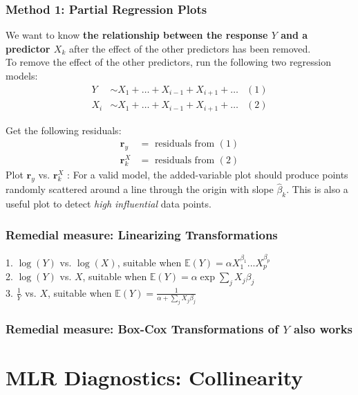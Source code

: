 \documentclass[11pt,a4paper]{article}
\begin{document}
\subsubsection{Method 1: Partial Regression Plots}
We want to know \textbf{the relationship between the response $Y$ and a predictor $X_{k}$} after the effect of the other predictors has been removed.\\
To remove the effect of the other predictors, run the following two regression models:
\begin{equation}
    \begin{aligned}
        Y &\sim X_{1}+\ldots+X_{i-1}+X_{i+1}+\ldots &(1)\\
X_{i} &\sim X_{1}+\ldots+X_{i-1}+X_{i+1}+\ldots &(2)
    \end{aligned}
    \nonumber
\end{equation}

Get the following residuals:
$$
\begin{aligned}
\mathbf{r}_{y} &=\text { residuals from }(1) \\
\mathbf{r}_{k}^{X} &=\text { residuals from }(2)
\end{aligned}
$$
Plot $\mathbf{r}_{y}$ vs. $\mathbf{r}_{k}^{X}$ : For a valid model, the added-variable plot should produce points randomly scattered around a line through the origin with slope $\hat{\beta}_{k}$. This is also a useful plot to detect \textit{high influential} data points.

\subsubsection{Remedial measure: Linearizing Transformations}
1. $\log(Y)$ vs. $\log(X)$, suitable when $\mathbb{E}(Y)=\alpha X_1^{\beta_1}...X_p^{\beta_p}$\\
2. $\log(Y)$ vs. $X$, suitable when $\mathbb{E}(Y)=\alpha \exp{\sum_j X_j\beta_j}$\\
3. $\frac{1}{Y}$ vs. $X$, suitable when $\mathbb{E}(Y)=\frac{1}{\alpha+{\sum_j X_j\beta_j}}$

\subsubsection{Remedial measure: Box-Cox Transformations of $Y$ also works}

\section{ MLR Diagnostics: Collinearity}
\end{document}
